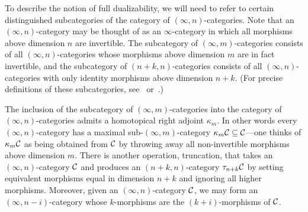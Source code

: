 \documentclass[a4paper]{amsart}
\begin{document}

To describe the notion of full dualizability, we will need to refer to certain distinguished subcategories of the category of $(\infty,n)$-categories.  Note that an $(\infty,n)$-category may be thought of as an $\infty$-category in which all morphisms above dimension $n$ are invertible.  The subcategory of $(\infty,m)$-categories consists of all $(\infty,n)$-categories whose morphisms above dimension $m$ are in fact invertible, and the subcategory of $(n+k,n)$-categories consists of all $(\infty,n)$-categories with only identity morphisms above dimension $n+k$.  (For precise definitions of these subcategories, see~\cite{Rezk} or~\cite{Barwick-SP}.)

The inclusion of the subcategory of $(\infty,m)$-categories into the category of $(\infty, n)$-categories admits a homotopical right adjoint $\kappa_m$.  In other words every $(\infty,n)$-category has a maximal sub-$(\infty,m)$-category $\kappa_m \mathcal C \subseteq \mathcal C$---one thinks of $\kappa_m \mathcal C$ as being obtained from $\mathcal C$ by throwing away all non-invertible morphisms above dimension $m$.   There is another operation, truncation, that takes an $(\infty,n)$-category $\mathcal C$ and produces an $(n+k,n)$-category $\tau_{n+k} \mathcal C$ by setting equivalent morphisms equal in dimension $n+k$ and ignoring all higher morphisms.  Moreover, given an $(\infty,n)$-category $\mathcal C$, we may form an $(\infty,n-i)$-category whose $k$-morphisms are the $(k+i)$-morphisms of $\mathcal C$.
\end{document}
